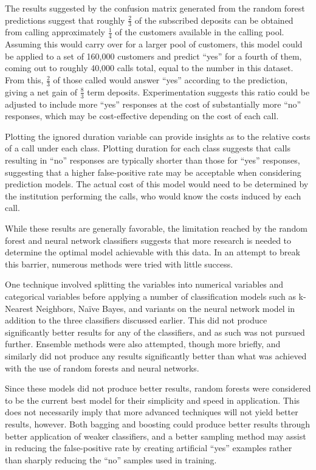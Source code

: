 \documentclass[prodmode]{acmsmall} %
\begin{document}
The results suggested by the confusion matrix generated from the random forest
predictions suggest that roughly $\frac{2}{3}$ of the subscribed deposits can be
obtained from calling approximately $\frac{1}{4}$ of the customers available in
the calling pool. Assuming this would carry over for a larger pool of customers,
this model could be applied to a set of 160,000 customers and predict ``yes''
for a fourth of them, coming out to roughly 40,000 calls total, equal to the
number in this dataset. From this, $\frac{2}{3}$ of those called would answer
``yes'' according to the prediction, giving a net gain of $\frac{8}{3}$ term
deposits. Experimentation suggests this ratio could be adjusted to include more
``yes'' responses at the cost of substantially more ``no'' responses, which may
be cost-effective depending on the cost of each call.

Plotting the ignored duration variable can provide insights as to the relative
costs of a call under each class. Plotting duration for each class suggests that
calls resulting in ``no'' responses are typically shorter than those for ``yes''
responses, suggesting that a higher false-positive rate may be acceptable when
considering prediction models. The actual cost of this model would need to be
determined by the institution performing the calls, who would know the costs
induced by each call.

While these results are generally favorable, the limitation reached by the
random forest and neural network classifiers suggests that more research is
needed to determine the optimal model achievable with this data. In an attempt
to break this barrier, numerous methods were tried with little success.

One technique involved splitting the variables into numerical variables and
categorical variables before applying a number of classification models such as
k-Nearest Neighbors, Na{\"i}ve Bayes, and variants on the neural network model
in addition to the three classifiers discussed earlier. This did not produce
significantly better results for any of the classifiers, and as such was not
pursued further. Ensemble methods were also attempted, though more briefly, and
similarly did not produce any results significantly better than what was
achieved with the use of random forests and neural networks.

Since these models did not produce better results, random forests were
considered to be the current best model for their simplicity and speed in
application. This does not necessarily imply that more advanced techniques will
not yield better results, however. Both bagging and boosting could produce
better results through better application of weaker classifiers, and a better
sampling method may assist in reducing the false-positive rate by creating
artificial ``yes'' examples rather than sharply reducing the ``no'' samples used
in training.
\end{document}
